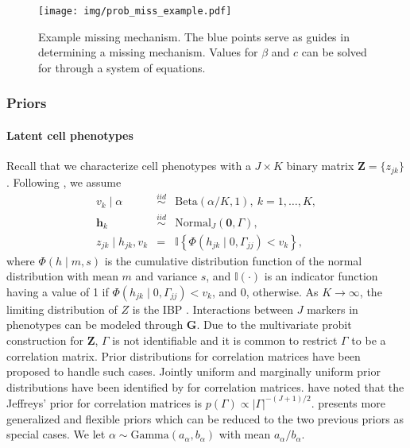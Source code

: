 \documentclass[12pt,]{article}
\newcommand{\abs}[1]{ \left|#1\right| }
\newcommand{\iid}{\overset{iid}{\sim}}
\def\h{\bm{h}}
\def\Z{\bm{Z}}
\begin{document}
\begin{figure}[th!]
\begin{center}
\texttt{[image: img/prob\_miss\_example.pdf]}
\caption{Example missing mechanism. The blue points serve as guides in
determining a missing mechanism. Values for $\beta$ and $c$ can be solved for
through a system of equations.}
\label{fig:prob-miss-eg}
\end{center}
\end{figure}



\subsubsection{Priors}\label{priors}
\paragraph*{Latent cell phenotypes}  Recall that we characterize cell phenotypes with a $J\times K$ binary matrix \(\Z =\{z_{jk}\}\).  Following \citet{williamson2010dependent}, we assume
\begin{eqnarray*}
  v_k \mid \alpha &\iid& \text{Beta}(\alpha/K, 1),~ k=1, \ldots, K, \\
  \h_k &\iid& \text{Normal}_J(\bm{0}, \Gamma), \\ 
  z_{jk} \mid h_{jk}, v_k &=& \mathbb{I}\left\{ \Phi(h_{jk} \mid 0,
  \Gamma_{jj}) < v_k \right\},
\end{eqnarray*}
where $\Phi(h \mid m, s)$ is the cumulative distribution function of the normal
distribution with mean $m$ and variance $s$, and $\mathbb{I}(\cdot)$ is an
indicator function having a value of 1 if $\Phi(h_{jk} \mid 0, \Gamma_{jj}) <
v_k$, and 0, otherwise.  As $K \rightarrow \infty$, the limiting distribution of
$Z$ is the IBP \citep{griffiths2011indian}.  Interactions between $J$ markers
in phenotypes can be modeled through $\bm G$.  Due to the multivariate probit
construction for $\Z$, $\Gamma$ is not identifiable and it is common to
restrict $\Gamma$ to be a correlation matrix. Prior distributions for
correlation matrices have been proposed to handle such cases. Jointly uniform
and marginally uniform prior distributions have been identified by
\cite{barnard2000modeling} for correlation matrices. \cite{box2011bayesian}
have noted that the Jeffreys' prior for correlation matrices is $p(\Gamma)
\propto \abs{\Gamma}^{-(J+1)/2}$.  \cite{zhang2006sampling} presents more
generalized and flexible priors which can be reduced to the two previous priors
as special cases.
%
We let $\alpha \sim \text{Gamma}(a_\alpha, b_\alpha)$ with mean $a_\alpha/b_\alpha$.  
\end{document}
